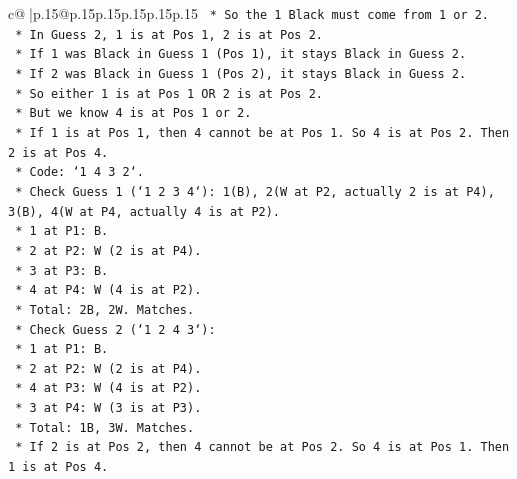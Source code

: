\documentclass{article}
\begin{document}
{\begin{supertabular}{c@{$\;$}|p{.15\linewidth}@{}p{.15\linewidth}p{.15\linewidth}p{.15\linewidth}p{.15\linewidth}p{.15\linewidth}}
{{{\texttt{                            *   So the 1 Black must come from 1 or 2.} \\
\texttt{                            *   In Guess 2, 1 is at Pos 1, 2 is at Pos 2.} \\
\texttt{                            *   If 1 was Black in Guess 1 (Pos 1), it stays Black in Guess 2.} \\
\texttt{                            *   If 2 was Black in Guess 1 (Pos 2), it stays Black in Guess 2.} \\
\texttt{                            *   So either 1 is at Pos 1 OR 2 is at Pos 2.} \\
\texttt{                            *   But we know 4 is at Pos 1 or 2.} \\
\texttt{                            *   If 1 is at Pos 1, then 4 cannot be at Pos 1. So 4 is at Pos 2. Then 2 is at Pos 4.} \\
\texttt{                                *   Code: `1 4 3 2`.} \\
\texttt{                                *   Check Guess 1 (`1 2 3 4`): 1(B), 2(W at P2, actually 2 is at P4), 3(B), 4(W at P4, actually 4 is at P2).} \\
\texttt{                                    *   1 at P1: B.} \\
\texttt{                                    *   2 at P2: W (2 is at P4).} \\
\texttt{                                    *   3 at P3: B.} \\
\texttt{                                    *   4 at P4: W (4 is at P2).} \\
\texttt{                                    *   Total: 2B, 2W. Matches.} \\
\texttt{                                *   Check Guess 2 (`1 2 4 3`):} \\
\texttt{                                    *   1 at P1: B.} \\
\texttt{                                    *   2 at P2: W (2 is at P4).} \\
\texttt{                                    *   4 at P3: W (4 is at P2).} \\
\texttt{                                    *   3 at P4: W (3 is at P3).} \\
\texttt{                                    *   Total: 1B, 3W. Matches.} \\
\texttt{                            *   If 2 is at Pos 2, then 4 cannot be at Pos 2. So 4 is at Pos 1. Then 1 is at Pos 4.} \\
}}}
\end{supertabular}}
\end{document}
